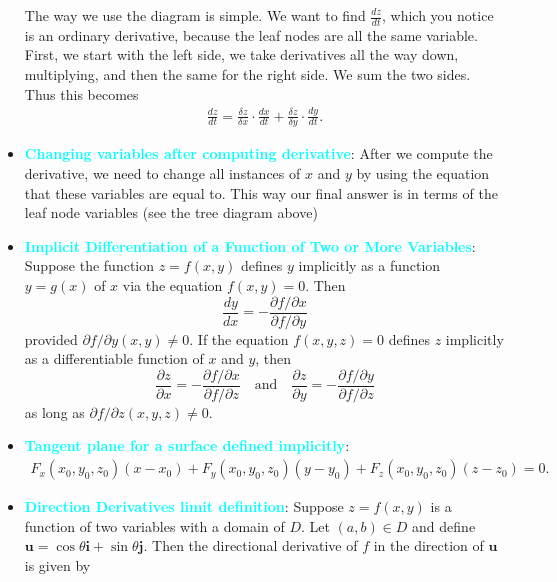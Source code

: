 \documentclass{report}
\begin{document}
\begin{itemize}
        \bigbreak \noindent 
    \begin{figure}[ht]
        \centering
        \label{fig:tree}
    \end{figure}
    \bigbreak \noindent 
    \bigbreak \noindent 
    The way we use the diagram is simple. We want to find $\frac{dz}{dt}$, which you notice is an ordinary derivative, because the leaf nodes are all the same variable. First, we start with the left side, we take derivatives all the way down, multiplying, and then the same for the right side. We sum the two sides. Thus this becomes
    \begin{align*}
        \frac{dz}{dt} = \frac{\delta z}{\delta x} \cdot \frac{dx}{dt}  + \frac{\delta z}{\delta y} \cdot \frac{dy}{dt}
    .\end{align*}
    \bigbreak \noindent 
    \item \textbf{\textcolor{cyan}{Changing variables after computing derivative}}: After we compute the derivative, we need to change all instances of $x$ and $y$ by using the equation that these variables are equal to. This way our final answer is in terms of the leaf node variables (see the tree diagram above)
    \item \textbf{\textcolor{cyan}{Implicit Differentiation of a Function of Two or More Variables}}:
        Suppose the function \(z = f(x,y)\) defines \(y\) implicitly as a function \(y = g(x)\) of \(x\) via the equation \(f(x,y) = 0\). Then
        \[
            \frac{dy}{dx} = -\frac{\partial f/\partial x}{\partial f/\partial y}
        \]
        provided \(\partial f/\partial y(x,y) \neq 0\).
        \bigbreak \noindent 
        If the equation \(f(x,y,z) = 0\) defines \(z\) implicitly as a differentiable function of \(x\) and \(y\), then
        \[
            \frac{\partial z}{\partial x} = -\frac{\partial f/\partial x}{\partial f/\partial z} \quad \text{and} \quad \frac{\partial z}{\partial y} = -\frac{\partial f/\partial y}{\partial f/\partial z}
        \]
        as long as \(\partial f/\partial z(x,y,z) \neq 0\).
    \item \textbf{\textcolor{cyan}{Tangent plane for a surface defined implicitly}}:
        \begin{align*}
            F_{x}(x_{0},y_{0},z_{0})(x-x_{0}) + F_{y}(x_{0}, y_{0}, z_{0})(y-y_{0}) + F_{z}(x_{0}, y_{0}, z_{0})(z-z_{0}) = 0
        .\end{align*}
    \item \textbf{\textcolor{cyan}{Direction Derivatives limit definition}}:
        Suppose $z=f(x,y)$ is a function of two variables with a domain of $D$. Let $(a,b) \in D$ and define $\mathbf{u}=\cos\theta \mathbf{i} + \sin\theta \mathbf{j}$. Then the directional derivative of $f$ in the direction of $\mathbf{u}$ is given by

\end{itemize}
\end{document}

